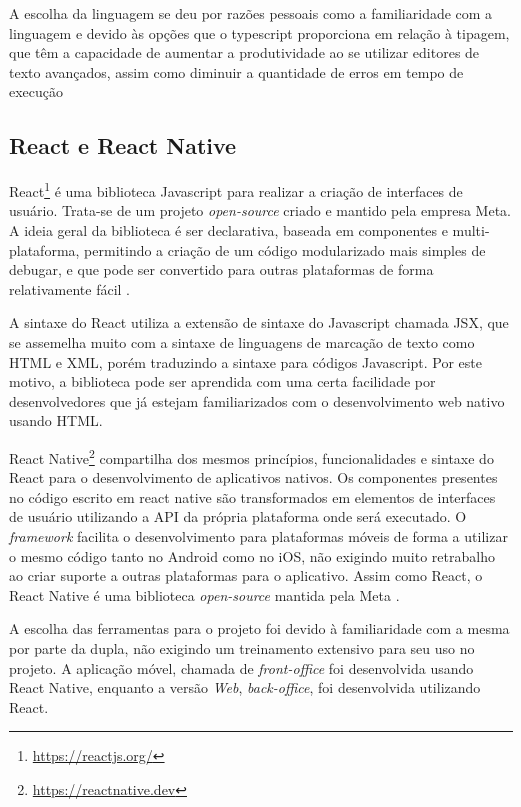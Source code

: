 A escolha da linguagem se deu por razões pessoais como a familiaridade com a linguagem e devido às opções que o typescript proporciona em relação à tipagem, que têm a capacidade de aumentar a produtividade ao se utilizar editores de texto avançados, assim como diminuir a quantidade de erros em tempo de execução

\subsection{React e React Native}
\label{react-section}

React\footnote{\url{https://reactjs.org/}} é uma biblioteca Javascript para realizar a criação de interfaces de usuário. Trata-se de um projeto \textit{open-source} criado e mantido pela empresa Meta. A ideia geral da biblioteca é ser declarativa, baseada em componentes e multi-plataforma, permitindo a criação de um código modularizado mais simples de debugar, e que pode ser convertido para outras plataformas de forma relativamente fácil \cite{react}.

A sintaxe do React utiliza a extensão de sintaxe do Javascript chamada JSX, que se assemelha muito com a sintaxe de linguagens de marcação de texto como HTML e XML, porém traduzindo a sintaxe para códigos Javascript. Por este motivo, a biblioteca pode ser aprendida com uma certa facilidade por desenvolvedores que já estejam familiarizados com o desenvolvimento web nativo usando HTML.

React Native\footnote{\url{https://reactnative.dev}} compartilha dos mesmos princípios, funcionalidades e sintaxe do React para o desenvolvimento de aplicativos nativos. Os componentes presentes no código escrito em react native são transformados em elementos de interfaces de usuário utilizando a API da própria plataforma onde será executado. O \textit{framework} facilita o desenvolvimento para plataformas móveis de forma a utilizar o mesmo código tanto no Android como no iOS, não exigindo muito retrabalho ao criar suporte a outras plataformas para o aplicativo. Assim como React, o React Native é uma biblioteca \textit{open-source} mantida pela Meta \cite{react-native}.

A escolha das ferramentas para o projeto \appName foi devido à familiaridade com a mesma por parte da dupla, não exigindo um treinamento extensivo para seu uso no projeto. A aplicação móvel, chamada de \textit{front-office} foi desenvolvida usando React Native, enquanto a versão \textit{Web}, \textit{back-office}, foi desenvolvida utilizando React.

